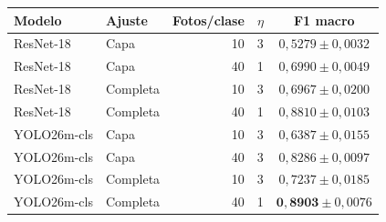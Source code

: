 \begin{tabular}{llrrc}\toprule
Modelo & Ajuste & Fotos/clase & $\eta$ & F1 macro\\\midrule
ResNet-18 & Capa & 10 & 3 & $0{,}5279 \pm 0{,}0032$ \\
ResNet-18 & Capa & 40 & 1 & $0{,}6990 \pm 0{,}0049$ \\
ResNet-18 & Completa & 10 & 3 & $0{,}6967 \pm 0{,}0200$ \\
ResNet-18 & Completa & 40 & 1 & $0{,}8810 \pm 0{,}0103$ \\
YOLO26m-cls & Capa & 10 & 3 & $0{,}6387 \pm 0{,}0155$ \\
YOLO26m-cls & Capa & 40 & 3 & $0{,}8286 \pm 0{,}0097$ \\
YOLO26m-cls & Completa & 10 & 3 & $0{,}7237 \pm 0{,}0185$ \\
YOLO26m-cls & Completa & 40 & 1 & $\mathbf{0{,}8903} \pm 0{,}0076$ \\
\bottomrule\end{tabular}
